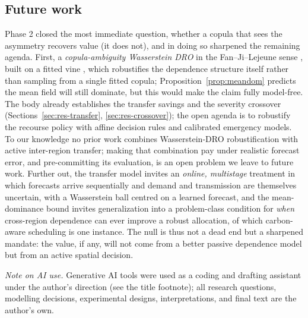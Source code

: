 \documentclass[10pt,twocolumn]{article}
\begin{document}
\subsection{Future work}
Phase 2 closed the most immediate question, whether a copula that sees the
asymmetry recovers value (it does not), and in doing so sharpened the remaining
agenda. First, a \emph{copula-ambiguity Wasserstein DRO} in the Fan--Ji--Lejeune
sense \citep{fan2024}, built on a fitted vine \citep{aas2009,dissmann2013}, which
robustifies the dependence structure itself rather than sampling from a single
fitted copula; Proposition~\ref{prop:meandom} predicts the mean field will still
dominate, but this would make the claim fully model-free.
The body already establishes the transfer savings and the severity crossover
(Sections~\ref{sec:res-transfer}, \ref{sec:res-crossover}); the open agenda is to
robustify the recourse policy with affine decision rules and calibrated emergency
models. To our knowledge no prior work combines Wasserstein-DRO robustification with
active inter-region transfer; making that combination pay under realistic forecast
error, and pre-committing its evaluation, is an open problem we leave to future
work. Further
out, the transfer model invites an \emph{online, multistage} treatment in which
forecasts arrive sequentially and demand and transmission are themselves uncertain,
with a Wasserstein ball centred on a learned forecast, and the mean-dominance bound
invites generalization into a problem-class condition for \emph{when} cross-region
dependence can ever improve a robust allocation, of which carbon-aware scheduling is
one instance. The null is thus not a dead end but a sharpened mandate: the value, if
any, will not come from a better passive dependence model but from an active spatial
decision.

\medskip\noindent\emph{Note on AI use.} Generative AI tools were used as a coding and
drafting assistant under the author's direction (see the title footnote); all research
questions, modelling decisions, experimental designs, interpretations, and final text
are the author's own.
\end{document}
